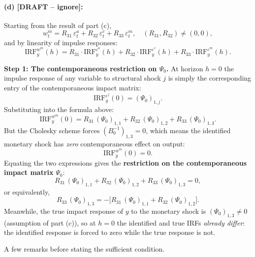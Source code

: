 \documentclass[12pt]{article}
\theoremstyle{definition}
\begin{document}



\iffalse
\paragraph{(d) [DRAFT -- ignore]:}
Starting from the result of part (c),
\[
w_t^m = R_{31}\,\varepsilon_t^a + R_{32}\,\varepsilon_t^c + R_{33}\,\varepsilon_t^m,
\quad (R_{31},R_{32})\neq(0,0),
\]
and by linearity of impulse responses:
\[
\text{IRF}_y^{w^m}(h)
= R_{31}\cdot\text{IRF}_y^{\varepsilon^a}(h)
+ R_{32}\cdot\text{IRF}_y^{\varepsilon^c}(h)
+ R_{33}\cdot\text{IRF}_y^{\varepsilon^m}(h).
\]

\noindent\textbf{Step 1: The contemporaneous restriction on $\Psi_0$.}
At horizon $h=0$ the impulse response of any variable to structural shock $j$ is simply the corresponding entry of the contemporaneous impact matrix:
\[
\text{IRF}_y^{\varepsilon^j}(0) = (\Psi_0)_{1,j}.
\]
Substituting into the formula above:
\[
\text{IRF}_y^{w^m}(0)
= R_{31}\,(\Psi_0)_{1,1} + R_{32}\,(\Psi_0)_{1,2} + R_{33}\,(\Psi_0)_{1,3}.
\]
But the Cholesky scheme forces $(B_0^{-1})_{1,3}=0$, which means the identified monetary shock has \emph{zero} contemporaneous effect on output:
\[
\text{IRF}_y^{w^m}(0) = 0.
\]
Equating the two expressions gives the \textbf{restriction on the contemporaneous impact matrix} $\Psi_0$:
\[
R_{31}\,(\Psi_0)_{1,1} + R_{32}\,(\Psi_0)_{1,2} + R_{33}\,(\Psi_0)_{1,3} = 0,
\]
or equivalently,
\[
R_{33}\,(\Psi_0)_{1,3} = -\bigl[R_{31}\,(\Psi_0)_{1,1} + R_{32}\,(\Psi_0)_{1,2}\bigr]. \tag{$*$}
\]
Meanwhile, the true impact response of $y$ to the monetary shock is $(\Psi_0)_{1,3}\neq 0$ (assumption of part (c)), so at $h=0$ the identified and true IRFs \emph{already differ}: the identified response is forced to zero while the true response is not.

\noindent A few remarks before stating the sufficient condition.
\end{document}
